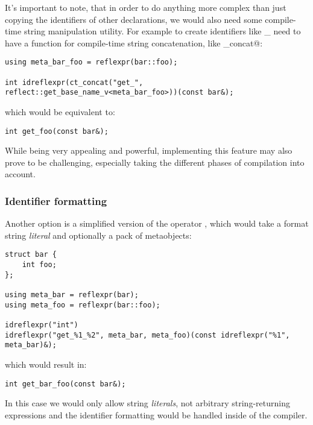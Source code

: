 It's important to note, that in order to do anything more complex than just
copying the identifiers of other declarations, we would also need some compile-time
string manipulation utility. For example to create identifiers like
\verb@get_%@ or \verb@set_%@ where \verb@%@ is a declaration name, we would
need to have a function for compile-time string concatenation, like
\verb@ct_concat@:

\begin{verbatim}
using meta_bar_foo = reflexpr(bar::foo);

int idreflexpr(ct_concat("get_", reflect::get_base_name_v<meta_bar_foo>))(const bar&);
\end{verbatim}

which would be equivalent to:

\begin{verbatim}
int get_foo(const bar&);
\end{verbatim}

While being very appealing and powerful, implementing this feature may
also prove to be challenging, especially taking the different phases
of compilation into account.

\subsubsection{Identifier formatting}
\label{fut-ident-formatting}

Another option is a simplified version of the operator \verb@idreflexpr@,
which would take a format string {\em literal} and optionally a pack of
 metaobjects:

\begin{verbatim}
struct bar {
	int foo;
};

using meta_bar = reflexpr(bar);
using meta_foo = reflexpr(bar::foo);

idreflexpr("int")
idreflexpr("get_%1_%2", meta_bar, meta_foo)(const idreflexpr("%1", meta_bar)&);
\end{verbatim}

which would result in:

\begin{verbatim}
int get_bar_foo(const bar&);
\end{verbatim}

In this case we would only allow string {\em literals}, not arbitrary
\verb@constexpr@ string-returning expressions and the identifier formatting
would be handled inside of the compiler.

